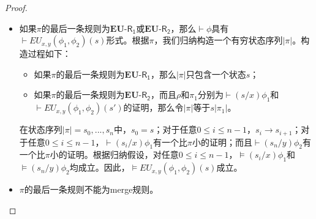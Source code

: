 \begin{proof}
\begin{itemize}
		\item 如果$\pi$的最后一条规则为$\mathbf{EU}$-$\mathsf{R_1}$或$\mathbf{EU}$-$\mathsf{R_2}$，那么$\vdash \phi$具有$\vdash EU_{x,y}(\phi_1, \phi_2)(s)$形式。根据$\pi$，我们归纳构造一个有穷状态序列$|\pi|$。构造过程如下：
		\begin{itemize}
			\item 如果$\pi$的最后一条规则为$\mathbf{EU}$-$\mathsf{R_1}$，那么$|\pi|$只包含一个状态$s$；
			\item 如果$\pi$的最后一条规则为$\mathbf{EU}$-$\mathsf{R_2}$，而且$\rho$和$\pi_1$分别为$\vdash (s/x)\phi_1$和$\vdash EU_{x,y}(\phi_1, \phi_2)(s')$的证明，那么令$|\pi|$等于$s|\pi_1|$。
		\end{itemize}
		在状态序列$|\pi| = s_0, ..., s_n$中，$s_0=s$；对于任意$0\le i\le n-1$，$s_i \longrightarrow s_{i+1}$；对于任意$0\le i\le n-1$，$\vdash (s_i/x)\phi_1$有一个比$\pi$小的证明；而且$\vdash (s_n/y)\phi_2$有一个比$\pi$小的证明。根据归纳假设，对任意$0\le i\le n-1$，$\models (s_i/x)\phi_1$和$\models (s_n/y)\phi_2$均成立。因此，$\models EU_{x,y}(\phi_1, \phi_2)(s)$成立。
		\item $\pi$的最后一条规则不能为merge规则。
	\end{itemize}
\end{proof}

